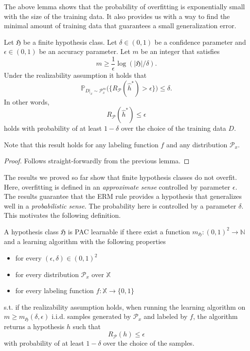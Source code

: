 The above lemma shows that the probability of overfitting is exponentially small
with the size of the training data. It also provides us with a way to find the
minimal amount of training data that guarantees a small generalization error.
    \begin{coro}
		\label{Coro:finite_hypo}
		Let $\mathfrak{H}$ be a finite hypothesis class. Let $\delta \in (0,1)$ be a confidence parameter and $\epsilon \in
		(0,1)$ be an accuracy parameter. Let $m$ be an integer that satisfies
		$$
		m \geq \frac{1}{\epsilon} \log(|\mathfrak{H}|/\delta).
		$$ 	
		Under the realizability assumption it holds that 
		$$
		\mathbb{P}_{D|_x \sim \mathcal{P}^m_x} \bigl( \{ R_\mathcal{P}(\hat{h}^*) > \epsilon \}\bigr) \leq \delta.
		$$
		In other words, 
		$$
		R_\mathcal{P}(\hat{h}^*) \leq \epsilon
		$$
		holds with probability of at least $1-\delta$ over the choice of the
		training data $D$.
	\end{coro}
	Note that this result holds for any labeling function $f$ and any
	distribution $\mathcal{P}_x$. 
    \begin{proof}
        Follows straight-forwardly from the previous lemma.
    \end{proof}
The results we proved so far show that finite hypothesis classes do not overfit.
Here, overfitting is defined in an \emph{approximate sense} controlled by parameter
$\epsilon$. The results guarantee that the ERM rule provides a hypothesis
that generalizes well in a \emph{probabilistic sense}. The probability here is
controlled by a parameter $\delta$. This motivates the following definition.

    \begin{definition}
		A hypothesis class $\mathfrak{H}$ is PAC learnable if there exist a
		function $m_\mathfrak{H}: (0,1)^2 \to \mathbb{N}$ and a learning
		algorithm with the following properties
		\begin{itemize}
			\item for every $(\epsilon, \delta) \in (0,1)^2$
			\item for every distribution $\mathcal{P}_x$ over $\mathbb{X}$
			\item for every labeling function $f: \mathbb{X} \to \{0,1\}$
		\end{itemize}
		s.t. if the realizability assumption holds, when running the learning
		algorithm on $m \geq m_\mathfrak{H}(\delta, \epsilon)$ i.i.d. samples
		generated by $\mathcal{P}_x$ and labeled by $f$, the algorithm returns a
		hypothesis $h$ such that 
		$$
		R_\mathcal{P}(h) \leq \epsilon
		$$ 
		with probability of at least $1-\delta$ over the choice of the samples.
	\end{definition}

